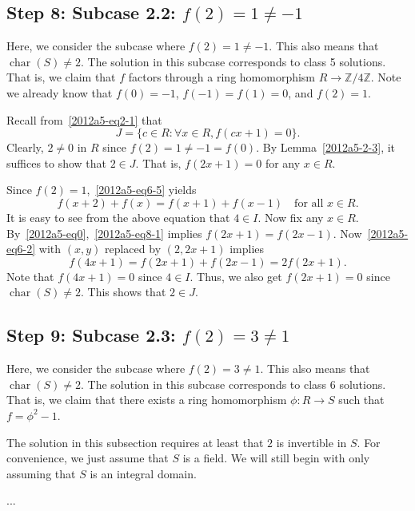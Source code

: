 \documentclass{article}
\newcommand{\Z}{\mathbb{Z}}
\DeclareMathOperator{\rchar}{char}
\begin{document}
\subsection*{Step 8: Subcase 2.2: $f(2) = 1 \neq -1$}

Here, we consider the subcase where $f(2) = 1 \neq -1$.
This also means that $\rchar(S) \neq 2$.
The solution in this subcase corresponds to class 5 solutions.
That is, we claim that $f$ factors through a ring homomorphism $R \to \Z/4\Z$.
Note we already know that $f(0) = -1$, $f(-1) = f(1) = 0$, and $f(2) = 1$.

Recall from~\eqref{2012a5-eq2-1} that
\[ J = \{c \in R : \forall x \in R, f(cx + 1) = 0\}. \]
Clearly, $2 \neq 0$ in $R$ since $f(2) = 1 \neq -1 = f(0)$.
By Lemma~\ref{2012a5-2-3}, it suffices to show that $2 \in J$.
That is, $f(2x + 1) = 0$ for any $x \in R$.

Since $f(2) = 1$,~\eqref{2012a5-eq6-5} yields
\[ f(x + 2) + f(x) = f(x + 1) + f(x - 1) \quad \text{for all } x \in R. \tag{8.1}\label{2012a5-eq8-1} \]
It is easy to see from the above equation that $4 \in I$.
Now fix any $x \in R$.
By~\eqref{2012a5-eq0},~\eqref{2012a5-eq8-1} implies $f(2x + 1) = f(2x - 1)$.
Now~\eqref{2012a5-eq6-2} with $(x, y)$ replaced by $(2, 2x + 1)$ implies
\[ f(4x + 1) = f(2x + 1) + f(2x - 1) = 2 f(2x + 1). \]
Note that $f(4x + 1) = 0$ since $4 \in I$.
Thus, we also get $f(2x + 1) = 0$ since $\rchar(S) \neq 2$.
This shows that $2 \in J$.









\subsection*{Step 9: Subcase 2.3: $f(2) = 3 \neq 1$}

Here, we consider the subcase where $f(2) = 3 \neq 1$.
This also means that $\rchar(S) \neq 2$.
The solution in this subcase corresponds to class 6 solutions.
That is, we claim that there exists a ring homomorphism $\phi : R \to S$ such that $f = \phi^2 - 1$.

The solution in this subsection requires at least that $2$ is invertible in $S$.
For convenience, we just assume that $S$ is a field.
We will still begin with only assuming that $S$ is an integral domain.

...
\end{document}
